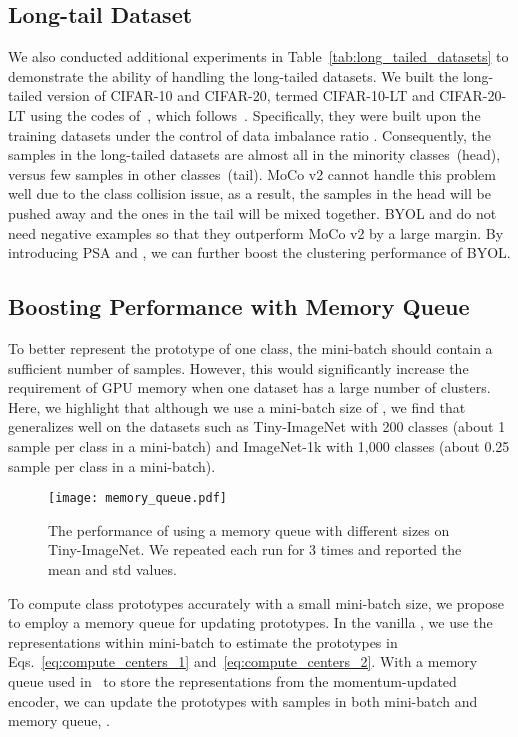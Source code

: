 \subsection{Long-tail Dataset}
We also conducted additional experiments in Table~\ref{tab:long_tailed_datasets} to demonstrate the ability of \methodname handling the long-tailed datasets.
We built the long-tailed version of CIFAR-10 and CIFAR-20, termed CIFAR-10-LT and CIFAR-20-LT using the codes of~\cite{tang2020long}, which follows~\cite{zhou2020bbn,cao2019learning}. Specifically, they were built upon the training datasets under the control of data imbalance ratio . Consequently, the samples in the long-tailed datasets are almost all in the minority classes~(head), versus few samples in other classes~(tail). MoCo v2 cannot handle this problem well due to the class collision issue, as a result, the samples in the head will be pushed away and the ones in the tail will be mixed together. BYOL and \methodname do not need negative examples so that they outperform MoCo v2 by a large margin. By introducing 
PSA and \lossname, we can further boost the clustering performance of BYOL.

\subsection{Boosting Performance with Memory Queue}
To better represent the prototype of one class, the mini-batch should contain a sufficient number of samples. However, this would significantly increase the requirement of GPU memory when one dataset has a large number of clusters. Here, we highlight that although we use a mini-batch size of , we find that \methodname generalizes well on the datasets such as Tiny-ImageNet with 200 classes (about 1 sample per class in a mini-batch) and ImageNet-1k with 1,000 classes (about 0.25 sample per class in a mini-batch).

\begin{figure}[t]
  \centering
  \texttt{[image: memory\_queue.pdf]}
  \caption{
    The performance of \methodname using a memory queue with different sizes on Tiny-ImageNet.
    We repeated each run for 3 times and reported the mean and std values.
    }
  \label{fig:memory_queue}
\end{figure}
To compute class prototypes accurately with a small mini-batch size, we propose to employ a memory queue for updating prototypes. In the vanilla \lossname, we use the representations within mini-batch  to estimate the prototypes in Eqs.~\eqref{eq:compute_centers_1} and~\eqref{eq:compute_centers_2}.
With a memory queue  used in~\cite{he2020momentum} to store the representations from the momentum-updated encoder, we can update the prototypes with samples in both mini-batch and memory queue, .

